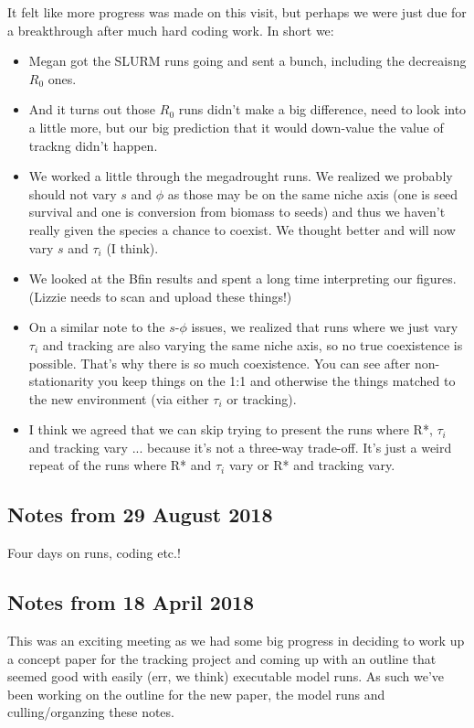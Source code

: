 \documentclass[11pt,a4paper,oneside]{article}
\newenvironment{smitemize}{
\begin{itemize}
  \setlength{\itemsep}{1pt}
  \setlength{\parskip}{0pt}
  \setlength{\parsep}{0pt}}
{\end{itemize}
}
\begin{document}
It felt like more progress was made on this visit, but perhaps we were just due for a breakthrough after much hard coding work. In short we:
\begin{smitemize}
\item Megan got the SLURM runs going and sent a bunch, including the decreaisng $R_0$ ones. 
\item And it turns out those $R_0$ runs didn't make a big difference, need to look into a little more, but our big prediction that it would down-value the value of trackng didn't happen.
\item We worked a little through the megadrought runs. We realized we probably should not vary $s$ and $\phi$ as those may be on the same niche axis (one is seed survival and one is conversion from biomass to seeds) and thus we haven't really given the species a chance to coexist. We thought better and will now vary $s$ and $\tau_i$ (I think).
\item We looked at the Bfin results and spent a long time interpreting our figures. (Lizzie needs to scan and upload these things!)
\item On a similar note to the $s$-$\phi$ issues, we realized that runs where we just vary $\tau_i$ and tracking are also varying the same niche axis, so no true coexistence is possible. That's why there is so much coexistence. You can see after non-stationarity you keep things on the 1:1 and otherwise the things matched to the new environment (via either $\tau_i$ or tracking).
\item I think we agreed that we can skip trying to present the runs where R*, $\tau_i$ and tracking vary ... because it's not a three-way trade-off. It's just a weird repeat of the runs where R* and $\tau_i$  vary or R* and tracking vary. 
\end{smitemize}


\subsection{Notes from 29 August 2018}
Four days on runs, coding etc.!

\subsection{Notes from 18 April 2018}
This was an exciting meeting as we had some big progress in deciding to work up a concept paper for the tracking project and coming up with an outline that seemed good with easily (err, we think) executable model runs. As such we've been working on the outline for the new paper, the model runs and culling/organzing these notes.
\end{document}

